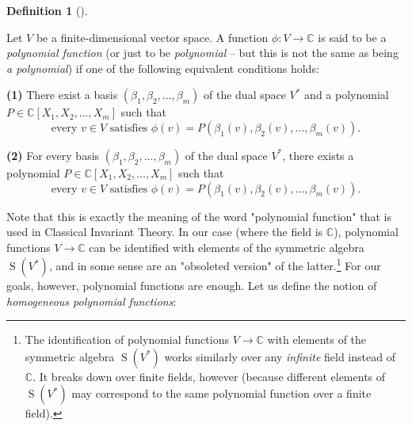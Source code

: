\documentclass
[numbers=enddot,12pt,final,onecolumn,german,notitlepage]{scrartcl}%
\theoremstyle{definition}
\newtheorem{defi}[theo]{Definition}
\newenvironment{definition}[1][]
{\begin{defi}[#1]\begin{leftbar}}
{\end{leftbar}\end{defi}}
\begin{document}
\begin{definition}
\label{def.det.US.poly}Let $V$ be a finite-dimensional vector space. A
function $\phi:V\rightarrow\mathbb{C}$ is said to be a \textit{polynomial
function} (or just to be \textit{polynomial} -- but this is not the same as
being \textit{a polynomial}) if one of the following equivalent conditions holds:

\textbf{(1)} There exist a basis $\left(  \beta_{1},\beta_{2},...,\beta
_{m}\right)  $ of the dual space $V^{\ast}$ and a polynomial $P\in
\mathbb{C}\left[  X_{1},X_{2},...,X_{m}\right]  $ such that%
\[
\text{every }v\in V\text{ satisfies }\phi\left(  v\right)  =P\left(  \beta
_{1}\left(  v\right)  ,\beta_{2}\left(  v\right)  ,...,\beta_{m}\left(
v\right)  \right)  .
\]


\textbf{(2)} For every basis $\left(  \beta_{1},\beta_{2},...,\beta
_{m}\right)  $ of the dual space $V^{\ast}$, there exists a polynomial
$P\in\mathbb{C}\left[  X_{1},X_{2},...,X_{m}\right]  $ such that%
\[
\text{every }v\in V\text{ satisfies }\phi\left(  v\right)  =P\left(  \beta
_{1}\left(  v\right)  ,\beta_{2}\left(  v\right)  ,...,\beta_{m}\left(
v\right)  \right)  .
\]

\end{definition}

Note that this is exactly the meaning of the word "polynomial function" that
is used in Classical Invariant Theory. In our case (where the field is
$\mathbb{C}$), polynomial functions $V\rightarrow\mathbb{C}$ can be identified
with elements of the symmetric algebra $\operatorname*{S}\left(  V^{\ast
}\right)  $, and in some sense are an "obsoleted version" of the
latter.\footnote{The identification of polynomial functions $V\rightarrow
\mathbb{C}$ with elements of the symmetric algebra $\operatorname*{S}\left(
V^{\ast}\right)  $ works similarly over any \textit{infinite} field instead of
$\mathbb{C}$. It breaks down over finite fields, however (because different
elements of $\operatorname*{S}\left(  V^{\ast}\right)  $ may correspond to the
same polynomial function over a finite field).} For our goals, however,
polynomial functions are enough. Let us define the notion of
\textit{homogeneous polynomial functions}:
\end{document}
